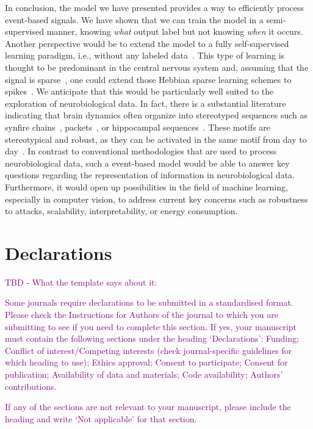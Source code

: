 \documentclass[default]{sn-jnl}%
\theoremstyle{thmstyleone}%
\theoremstyle{thmstyletwo}%
\theoremstyle{thmstylethree}%
\begin{document}
In conclusion, the model we have presented provides a way to efficiently process event-based signals. We have shown that we can train the model in a semi-supervised manner, knowing \emph{what} output label but not knowing \emph{when} it occurs. Another perspective would be to extend the model to a fully self-supervised learning paradigm, i.e., without any labeled data~\citep{barlow_unsupervised_1989}. This type of learning is thought to be predominant in the central nervous system and, assuming that the signal is sparse~\citep{olshausen_emergence_1996}, one could extend those Hebbian sparse learning schemes to spikes~\citep{perrinet_emergence_2004, masquelier_competitive_2009}. We anticipate that this would be particularly well suited to the exploration of neurobiological data. In fact, there is a substantial literature indicating that brain dynamics often organize into stereotyped sequences such as synfire chains~\citep{ikegaya_synfire_2004}, packets~\citep{luczak_sequential_2007}, or hippocampal sequences~\citep{pastalkova_internally_2008, villette_internally_2015}. These motifs are stereotypical and robust, as they can be activated in the same motif from day to day~\citep{haimerl_internal_2019}. In contrast to conventional methodologies that are used to process neurobiological data, such a event-based model would be able to answer key questions regarding the representation of information in neurobiological data. Furthermore, it would open up possibilities in the field of machine learning, especially in computer vision, to address current key concerns such as robustness to attacks, scalability, interpretability, or energy consumption.
%
\backmatter
%
%
\Acknowledgments
%
\section*{Declarations}

\textcolor{purple}{TBD - What the template says about it:}

\textcolor{purple}{Some journals require declarations to be submitted in a standardised format. Please check the Instructions for Authors of the journal to which you are submitting to see if you need to complete this section. If yes, your manuscript must contain the following sections under the heading `Declarations': Funding; Conflict of interest/Competing interests (check journal-specific guidelines for which heading to use); Ethics approval; Consent to participate; Consent for publication; Availability of data and materials; Code availability; Authors' contributions. }

\textcolor{purple}{If any of the sections are not relevant to your manuscript, please include the heading and write `Not applicable' for that section. }



\end{document}
